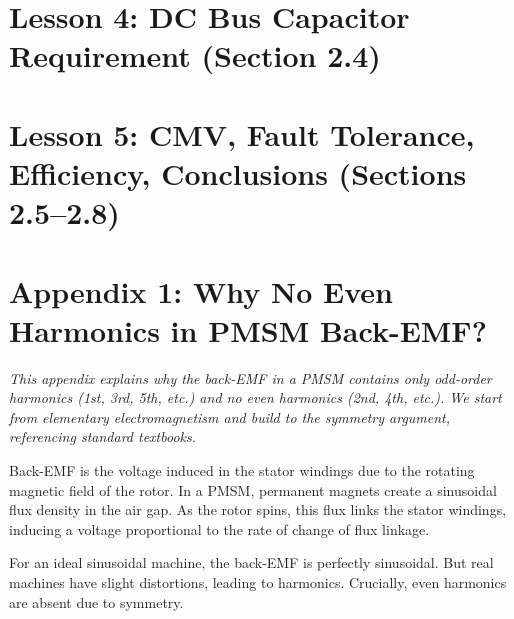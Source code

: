\documentclass[12pt, a4paper]{article}
\begin{document}
\section{Lesson 4: DC Bus Capacitor Requirement (Section 2.4)}
\label{sec:lesson4}


\clearpage

\section{Lesson 5: CMV, Fault Tolerance, Efficiency, Conclusions (Sections 2.5–2.8)}
\label{sec:lesson5}


\clearpage

\appendix

\section{Appendix 1: Why No Even Harmonics in PMSM Back-EMF?}
\label{app:even_harmonics}

\textit{This appendix explains why the back-EMF in a PMSM contains only odd-order harmonics (1st, 3rd, 5th, etc.) and no even harmonics (2nd, 4th, etc.). We start from elementary electromagnetism and build to the symmetry argument, referencing standard textbooks.}

\begin{physbox}
Back-EMF is the voltage induced in the stator windings due to the rotating magnetic field of the rotor. In a PMSM, permanent magnets create a sinusoidal flux density in the air gap. As the rotor spins, this flux links the stator windings, inducing a voltage proportional to the rate of change of flux linkage.

For an ideal sinusoidal machine, the back-EMF is perfectly sinusoidal. But real machines have slight distortions, leading to harmonics. Crucially, even harmonics are absent due to symmetry.
\end{physbox}
\end{document}
